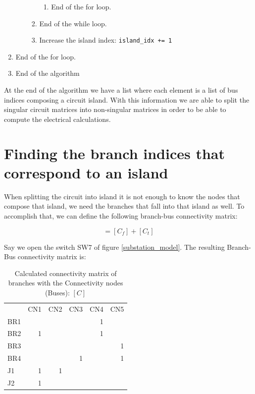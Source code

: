 \documentclass[nols,a4paper,twoside,notoc,fleqn]{tufte-book}
\begin{document}
\begin{enumerate}
\begin{enumerate}
\begin{enumerate}
\begin{enumerate}
				\item End of the for loop.
				
			\end{enumerate}
			
			\item End of the while loop.
			
			\item Increase the island index: \verb|island_idx += 1|
			
		\end{enumerate}
		
	\end{enumerate}
	
	\item End of the for loop.
	
	\item End of the algorithm
\end{enumerate}

At the end of the algorithm we have a list where each element is a list of bus indices composing a circuit island. With this information we are able to split the singular circuit matrices into non-singular matrices in order to be able to compute the electrical calculations.

\section{Finding the branch indices that correspond to an island}

When splitting the circuit into island it is not enough to know the nodes that compose that island, we need the branches that fall into that island as well. To accomplish that, we can define the following branch-bus connectivity matrix:

\begin{equation}
[C] = [C_f] + [C_t]
\end{equation}

Say we open the switch SW7 of figure \ref{substation_model}. The resulting Branch-Bus connectivity matrix is:

\begin{table}[h!]
 \begin{tabular}{lrrrrr}
	{} &  CN1 &  CN2 &  CN3 &  CN4 &  CN5 \\
	BR1 &      &      &      &    1 &      \\
	BR2 &    1 &      &      &    1 &      \\
	BR3 &      &      &      &      &    1 \\
	BR4 &      &      &    1 &      &    1 \\
	J1  &    1 &    1 &      &      &      \\
	J2  &    1 &      &      &      &      \\
\end{tabular}
	\caption{Calculated connectivity matrix of branches with the Connectivity nodes (Buses): $[C]$}
\end{table}
\end{document}
